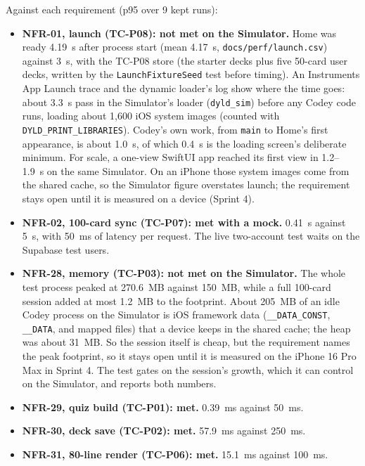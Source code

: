 \documentclass[12pt,letterpaper]{article}
\begin{document}
Against each requirement (p95 over 9 kept runs):
\begin{itemize}
  \item \textbf{NFR-01, launch (TC-P08): not met on the Simulator.} Home was ready
        4.19~s after process start (mean 4.17~s, \texttt{docs/perf/launch.csv}) against
        3~s, with the TC-P08 store (the starter decks plus five 50-card user decks,
        written by the \texttt{LaunchFixtureSeed} test before timing). An Instruments App Launch trace and the
        dynamic loader's log show where the time goes: about 3.3~s pass in the
        Simulator's loader (\texttt{dyld\_sim}) before any Codey code runs, loading
        about 1{,}600 iOS system images (counted with \texttt{DYLD\_PRINT\_LIBRARIES}).
        Codey's own work, from \texttt{main} to Home's first appearance, is about
        1.0~s, of which 0.4~s is the loading screen's deliberate minimum. For scale,
        a one-view SwiftUI app reached its first view in 1.2--1.9~s on the same
        Simulator. On an iPhone those system images come from the shared cache, so
        the Simulator figure overstates launch; the requirement stays open until it
        is measured on a device (Sprint 4).
  \item \textbf{NFR-02, 100-card sync (TC-P07): met with a mock.} 0.41~s against
        5~s, with 50~ms of latency per request. The live two-account test waits on
        the Supabase test users.
  \item \textbf{NFR-28, memory (TC-P03): not met on the Simulator.} The whole test
        process peaked at 270.6~MB against 150~MB, while a full 100-card session
        added at most 1.2~MB to the footprint. About 205~MB of an idle Codey process on the
        Simulator is iOS framework data (\texttt{\_\_DATA\_CONST}, \texttt{\_\_DATA}, and
        mapped files) that a device keeps in the shared cache; the heap was about
        31~MB. So the session itself is cheap, but the requirement names the peak
        footprint, so it stays open until it is measured on the iPhone 16 Pro Max in
        Sprint 4. The test gates on the session's growth, which it can control on the
        Simulator, and reports both numbers.
  \item \textbf{NFR-29, quiz build (TC-P01): met.} 0.39~ms against 50~ms.
  \item \textbf{NFR-30, deck save (TC-P02): met.} 57.9~ms against 250~ms.
  \item \textbf{NFR-31, 80-line render (TC-P06): met.} 15.1~ms against 100~ms.
\end{itemize}
\end{document}
